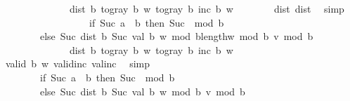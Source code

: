 \begin{isabellebody}
\ \ \ \ \ \ \ \ \ \ \ \ \ {\isacharplus}{\kern0pt}\ dist\ b\ {\isacharparenleft}{\kern0pt}to{\isacharunderscore}{\kern0pt}gray\ b\ w{\isacharparenright}{\kern0pt}\ {\isacharparenleft}{\kern0pt}to{\isacharunderscore}{\kern0pt}gray\ b\ {\isacharparenleft}{\kern0pt}inc\ b\ w{\isacharparenright}{\kern0pt}{\isacharparenright}{\kern0pt}{\isacharparenright}{\kern0pt}{\isachardoublequoteclose}\isanewline
\ \ \ \ \ \ \isamarkupfalse%
\ dist{\isacharunderscore}{\kern0pt}{}\ dist{}{\isacharunderscore}{\kern0pt}{}\ \isamarkupfalse%
\ simp\isanewline
\ \ \ \ \isamarkupfalse%
\ \isamarkupfalse%
\ {\isachardoublequoteopen}{\isachardot}{\kern0pt}{\isachardot}{\kern0pt}{\isachardot}{\kern0pt}\ {\isacharequal}{\kern0pt}\ {\isacharparenleft}{\kern0pt}\isanewline
\ \ \ \ \ \ \ \ if\ Suc\ a\ {\isasymnoteq}\ b\ then\ Suc\ {}\ mod\ b\isanewline
\ \ \ \ \ \ \ \ else\ Suc\ {\isacharparenleft}{\kern0pt}dist{}\ b\ {\isacharparenleft}{\kern0pt}Suc\ {\isacharparenleft}{\kern0pt}val\ b\ w{\isacharparenright}{\kern0pt}\ mod\ b{\isacharcircum}{\kern0pt}length{\isacharparenleft}{\kern0pt}w{\isacharparenright}{\kern0pt}\ mod\ b{\isacharparenright}{\kern0pt}\ {\isacharquery}{\kern0pt}v{\isacharparenright}{\kern0pt}\ mod\ b\isanewline
\ \ \ \ \ \ \ \ \ \ \ \ \ {\isacharplus}{\kern0pt}\ dist\ b\ {\isacharparenleft}{\kern0pt}to{\isacharunderscore}{\kern0pt}gray\ b\ w{\isacharparenright}{\kern0pt}\ {\isacharparenleft}{\kern0pt}to{\isacharunderscore}{\kern0pt}gray\ b\ {\isacharparenleft}{\kern0pt}inc\ b\ w{\isacharparenright}{\kern0pt}{\isacharparenright}{\kern0pt}{\isacharparenright}{\kern0pt}{\isachardoublequoteclose}\isanewline
\ \ \ \ \ \ \isamarkupfalse%
\ {\isacartoucheopen}valid\ b\ w{\isacartoucheclose}\ valid{\isacharunderscore}{\kern0pt}inc\ val{\isacharunderscore}{\kern0pt}inc\ \isamarkupfalse%
\ simp\isanewline
\ \ \ \ \isamarkupfalse%
\ \isamarkupfalse%
\ {\isachardoublequoteopen}{\isachardot}{\kern0pt}{\isachardot}{\kern0pt}{\isachardot}{\kern0pt}\ {\isacharequal}{\kern0pt}\ {\isacharparenleft}{\kern0pt}\isanewline
\ \ \ \ \ \ \ \ if\ Suc\ a\ {\isasymnoteq}\ b\ then\ Suc\ {}\ mod\ b\isanewline
\ \ \ \ \ \ \ \ else\ Suc\ {\isacharparenleft}{\kern0pt}dist{}\ b\ {\isacharparenleft}{\kern0pt}Suc\ {\isacharparenleft}{\kern0pt}val\ b\ w{\isacharparenright}{\kern0pt}\ mod\ b{\isacharparenright}{\kern0pt}\ {\isacharquery}{\kern0pt}v{\isacharparenright}{\kern0pt}\ mod\ b\isanewline

\end{isabellebody}
